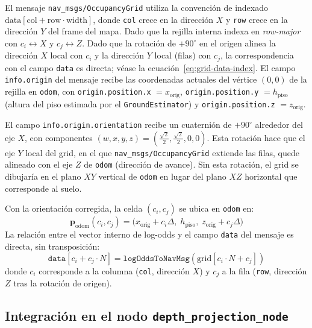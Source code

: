 El mensaje \texttt{nav\_msgs/OccupancyGrid} utiliza la convención de indexado
$\text{data}[\text{col} + \text{row} \cdot \text{width}]$, donde
\texttt{col} crece en la dirección $X$ y \texttt{row} crece en la dirección
$Y$ del frame del mapa. Dado que la rejilla interna indexa en \emph{row-major}
con $c_i \leftrightarrow X$ y $c_j \leftrightarrow Z$.  Dado que la
rotación de $+90^{\circ}$ en el origen alinea la dirección $X$ local con
$c_i$ y la dirección $Y$ local (filas) con $c_j$, la correspondencia
con el campo \texttt{data} es directa; véase la
ecuación~\ref{eq:grid-data-index}.
%
El campo \texttt{info.origin} del mensaje recibe las coordenadas actuales del
vértice $(0, 0)$ de la rejilla en \texttt{odom}, con
\texttt{origin.position.x} $= x_{\text{orig}}$,
\texttt{origin.position.y} $= h_{\text{piso}}$ (altura del piso estimada por
el \texttt{GroundEstimator}) y
\texttt{origin.position.z} $= z_{\text{orig}}$.

El campo \texttt{info.origin.orientation} recibe un cuaternión de $+90^{\circ}$
alrededor del eje $X$, con componentes $(w, x, y, z) = (\tfrac{\sqrt{2}}{2},
\tfrac{\sqrt{2}}{2}, 0, 0)$. Esta rotación hace que el eje $Y$ local del
grid, en el que \texttt{nav\_msgs/OccupancyGrid} extiende las filas, quede
alineado con el eje $Z$ de \texttt{odom} (dirección de avance). Sin esta
rotación, el grid se dibujaría en el plano $XY$ vertical de \texttt{odom}
en lugar del plano $XZ$ horizontal que corresponde al suelo.

Con la orientación corregida, la celda $(c_i, c_j)$ se ubica en \texttt{odom}
en:
%
\begin{equation}
  \label{eq:cell-world-pos}
  \mathbf{p}_{\text{odom}}(c_i, c_j)
  = \bigl(x_{\text{orig}} + c_i \Delta,\; h_{\text{piso}},\; z_{\text{orig}} + c_j \Delta\bigr)
\end{equation}
%
La relación entre el vector interno de log-odds y el campo \texttt{data} del
mensaje es directa, sin transposición:
%
\begin{equation}
  \label{eq:grid-data-index}
  \texttt{data}[c_i + c_j \cdot N]
  = \texttt{logOddsToNavMsg}\!\left(\text{grid}[c_i \cdot N + c_j]\right)
\end{equation}
%
donde $c_i$ corresponde a la columna (\texttt{col}, dirección $X$) y $c_j$
a la fila (\texttt{row}, dirección $Z$ tras la rotación de origen).

\subsection{Integración en el nodo \texttt{depth\_projection\_node}}
\label{subsec:lm-v5-integracion}

